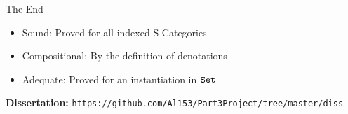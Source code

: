 
\begin{frame}{The End}
    \begin{itemize}\setlength\itemsep{3em}
        \item Sound: Proved for all indexed S-Categories \checkmark
        \item Compositional: By the definition of denotations \checkmark
        \item Adequate: Proved for an instantiation in $\texttt{Set}$ \checkmark
    \end{itemize}

    \textbf{Dissertation: } \texttt{https://github.com/Al153/Part3Project/tree/master/diss}

    
\end{frame}